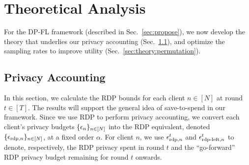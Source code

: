 \section{Theoretical Analysis}\label{sec:theory}
For the DP-FL framework (described in Sec.~\ref{sec:propose}), we now develop the theory that underlies our privacy accounting (Sec.~\ref{sec:theory:privacy}), and optimize the sampling rates to improve utility (Sec.~\ref{sec:theory:permutation}). 

\subsection{Privacy Accounting} \label{sec:theory:privacy}
In this section, we calculate the RDP bounds for each client $n\in [N]$ at round $t\in [T]$. The results will support the general idea of save-to-spend in our framework. Since we use RDP to perform privacy accounting, we convert each client's privacy budgets $\{{\epsilon}_n\}_{n\in [N]}$ into the RDP equivalent, denoted $\{{\epsilon}_{\text{rdp}, n}\}_{n\in [N]}$, at a fixed order $\alpha$. For client $n$, we use ${\epsilon}_{\text{rdp}, n}^t$ and ${\epsilon}_{\text{rdp-left}, n}^t$ to denote, respectively, the RDP privacy spent in round $t$ and the ``go-forward'' RDP privacy budget remaining for round $t$ onwards.

